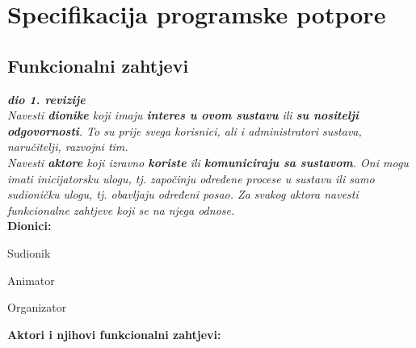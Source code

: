 \chapter{Specifikacija programske potpore}
		
	\section{Funkcionalni zahtjevi}
			
			\textbf{\textit{dio 1. revizije}}\\
			
			\textit{Navesti \textbf{dionike} koji imaju \textbf{interes u ovom sustavu} ili  \textbf{su nositelji odgovornosti}. To su prije svega korisnici, ali i administratori sustava, naručitelji, razvojni tim.}\\
				
			\textit{Navesti \textbf{aktore} koji izravno \textbf{koriste} ili \textbf{komuniciraju sa sustavom}. Oni mogu imati inicijatorsku ulogu, tj. započinju određene procese u sustavu ili samo sudioničku ulogu, tj. obavljaju određeni posao. Za svakog aktora navesti funkcionalne zahtjeve koji se na njega odnose.}\\
			
			
			\noindent \textbf{Dionici:}
			
			\begin{packed_enum}
				
				\item Sudionik
				\item Animator				
				\item Organizator
				
			\end{packed_enum}
			
			\noindent \textbf{Aktori i njihovi funkcionalni zahtjevi:}
			
